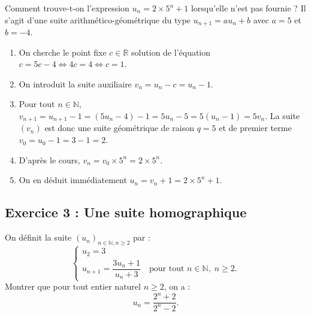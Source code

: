 \documentclass[11pt,a4paper]{article}
\newcommand{\N}{\mathbb{N}}
\newcommand{\R}{\mathbb{R}}
\begin{document}
\begin{remarquabox}
Comment trouve-t-on l'expression $u_n = 2 \times 5^n + 1$ lorsqu'elle n'est pas fournie ?
Il s'agit d'une suite arithmético-géométrique du type $u_{n+1} = a u_n + b$ avec $a=5$ et $b=-4$.
\begin{enumerate}
    \item On cherche le point fixe $c \in \R$ solution de l'équation $c = 5c - 4 \iff 4c = 4 \iff c = 1$.
    \item On introduit la suite auxiliaire $v_n = u_n - c = u_n - 1$.
    \item Pour tout $n \in \N$, $v_{n+1} = u_{n+1} - 1 = (5u_n - 4) - 1 = 5u_n - 5 = 5(u_n - 1) = 5v_n$.
    La suite $(v_n)$ est donc une suite géométrique de raison $q = 5$ et de premier terme $v_0 = u_0 - 1 = 3 - 1 = 2$.
    \item D'après le cours, $v_n = v_0 \times 5^n = 2 \times 5^n$.
    \item On en déduit immédiatement $u_n = v_n + 1 = 2 \times 5^n + 1$.
\end{enumerate}
\end{remarquabox}

\subsection*{Exercice 3 : Une suite homographique}

On définit la suite $(u_n)_{n \in \N, n \ge 2}$ par :
\[
\begin{cases}
u_2 = 3 \\
u_{n+1} = \dfrac{3u_n + 1}{u_n + 3} \quad \text{pour tout } n \in \N, \; n \ge 2.
\end{cases}
\]
Montrer que pour tout entier naturel $n \ge 2$, on a :
\[
u_n = \frac{2^n + 2}{2^n - 2}.
\]
\end{document}
